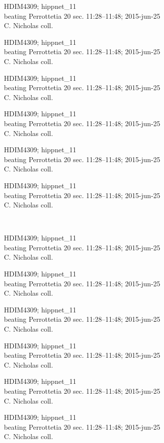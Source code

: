 \documentclass[2pt]{extarticle}
\begin{document}
\noindent
\parbox{0.16\textwidth}{\tiny \raggedright \rule[-0.3\baselineskip]{0pt}{10pt}HDIM4309; hippnet\_11\\ beating Perrottetia 20 sec. 11:28--11:48; 2015-jun-25\\ C. Nicholas coll.}
\parbox{0.16\textwidth}{\tiny \raggedright \rule[-0.3\baselineskip]{0pt}{10pt}HDIM4309; hippnet\_11\\ beating Perrottetia 20 sec. 11:28--11:48; 2015-jun-25\\ C. Nicholas coll.}
\parbox{0.16\textwidth}{\tiny \raggedright \rule[-0.3\baselineskip]{0pt}{10pt}HDIM4309; hippnet\_11\\ beating Perrottetia 20 sec. 11:28--11:48; 2015-jun-25\\ C. Nicholas coll.}
\parbox{0.16\textwidth}{\tiny \raggedright \rule[-0.3\baselineskip]{0pt}{10pt}HDIM4309; hippnet\_11\\ beating Perrottetia 20 sec. 11:28--11:48; 2015-jun-25\\ C. Nicholas coll.}
\parbox{0.16\textwidth}{\tiny \raggedright \rule[-0.3\baselineskip]{0pt}{10pt}HDIM4309; hippnet\_11\\ beating Perrottetia 20 sec. 11:28--11:48; 2015-jun-25\\ C. Nicholas coll.}
\parbox{0.16\textwidth}{\tiny \raggedright \rule[-0.3\baselineskip]{0pt}{10pt}HDIM4309; hippnet\_11\\ beating Perrottetia 20 sec. 11:28--11:48; 2015-jun-25\\ C. Nicholas coll.} \\ 
\vspace{0.001in} 

\noindent
\parbox{0.16\textwidth}{\tiny \raggedright \rule[-0.3\baselineskip]{0pt}{10pt}HDIM4309; hippnet\_11\\ beating Perrottetia 20 sec. 11:28--11:48; 2015-jun-25\\ C. Nicholas coll.}
\parbox{0.16\textwidth}{\tiny \raggedright \rule[-0.3\baselineskip]{0pt}{10pt}HDIM4309; hippnet\_11\\ beating Perrottetia 20 sec. 11:28--11:48; 2015-jun-25\\ C. Nicholas coll.}
\parbox{0.16\textwidth}{\tiny \raggedright \rule[-0.3\baselineskip]{0pt}{10pt}HDIM4309; hippnet\_11\\ beating Perrottetia 20 sec. 11:28--11:48; 2015-jun-25\\ C. Nicholas coll.}
\parbox{0.16\textwidth}{\tiny \raggedright \rule[-0.3\baselineskip]{0pt}{10pt}HDIM4309; hippnet\_11\\ beating Perrottetia 20 sec. 11:28--11:48; 2015-jun-25\\ C. Nicholas coll.}
\parbox{0.16\textwidth}{\tiny \raggedright \rule[-0.3\baselineskip]{0pt}{10pt}HDIM4309; hippnet\_11\\ beating Perrottetia 20 sec. 11:28--11:48; 2015-jun-25\\ C. Nicholas coll.}
\parbox{0.16\textwidth}{\tiny \raggedright \rule[-0.3\baselineskip]{0pt}{10pt}HDIM4309; hippnet\_11\\ beating Perrottetia 20 sec. 11:28--11:48; 2015-jun-25\\ C. Nicholas coll.} \\ 
\vspace{0.001in} 
\end{document}
